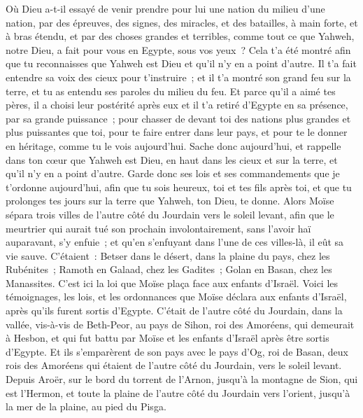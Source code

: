 \begin{multicols}{2}
Où Dieu a-t-il essayé de venir prendre pour lui une nation du milieu d'une nation, par des épreuves, des signes, des miracles, et des batailles, à main forte, et à bras étendu, et par des choses grandes et terribles, comme tout ce que Yahweh, notre Dieu, a fait pour vous en Egypte, sous vos yeux~?
Cela t'a été montré afin que tu reconnaisses que Yahweh est Dieu et qu'il n'y en a point d'autre.
Il t'a fait entendre sa voix des cieux pour t'instruire~; et il t'a montré son grand feu sur la terre, et tu as entendu ses paroles du milieu du feu.
Et parce qu'il a aimé tes pères, il a choisi leur postérité après eux et il t'a retiré d'Egypte en sa présence, par sa grande puissance~;
pour chasser de devant toi des nations plus grandes et plus puissantes que toi, pour te faire entrer dans leur pays, et pour te le donner en héritage, comme tu le vois aujourd'hui.
Sache donc aujourd'hui, et rappelle dans ton cœur que Yahweh est Dieu, en haut dans les cieux et sur la terre, et qu'il n'y en a point d'autre.
Garde donc ses lois et ses commandements que je t'ordonne aujourd'hui, afin que tu sois heureux, toi et tes fils après toi, et que tu prolonges tes jours sur la terre que Yahweh, ton Dieu, te donne.
Alors Moïse sépara trois villes de l'autre côté du Jourdain vers le soleil levant,
afin que le meurtrier qui aurait tué son prochain involontairement, sans l'avoir haï auparavant, s'y enfuie~; et qu'en s'enfuyant dans l'une de ces villes-là, il eût sa vie sauve.
C'étaient~: Betser dans le désert, dans la plaine du pays, chez les Rubénites~; Ramoth en Galaad, chez les Gadites~; Golan en Basan, chez les Manassites.
C'est ici la loi que Moïse plaça face aux enfants d'Israël.
Voici les témoignages, les lois, et les ordonnances que Moïse déclara aux enfants d'Israël, après qu'ils furent sortis d'Egypte.
C'était de l'autre côté du Jourdain, dans la vallée, vis-à-vis de Beth-Peor, au pays de Sihon, roi des Amoréens, qui demeurait à Hesbon, et qui fut battu par Moïse et les enfants d'Israël après être sortis d'Egypte.
Et ils s'emparèrent de son pays avec le pays d'Og, roi de Basan, deux rois des Amoréens qui étaient de l'autre côté du Jourdain, vers le soleil levant.
Depuis Aroër, sur le bord du torrent de l'Arnon, jusqu'à la montagne de Sion, qui est l'Hermon,
et toute la plaine de l'autre côté du Jourdain vers l'orient, jusqu'à la mer de la plaine, au pied du Pisga.

\end{multicols}
